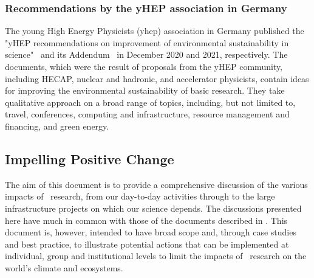 \documentclass[../SustainableHEP.tex]{subfiles}
\begin{document}
\subsubsection{Recommendations by the yHEP association in Germany}

The young High Energy Physicists (\acrshort{yhep}) association in Germany published the "yHEP recommendations on improvement of environmental sustainability in science"~\cite{yHEP1} and its Addendum~\cite{yHEP2} in December 2020 and 2021, respectively. The documents, which were the result of proposals from the yHEP community, including HECAP, nuclear and hadronic, and accelerator physicists, contain ideas for improving the environmental sustainability of basic research. %
They take qualitative approach on a broad range of topics, including, but not limited to, travel, conferences, computing and infrastructure, resource management and financing, and green energy. 


\subsection{Impelling Positive Change}

The aim of this document is to provide a comprehensive discussion of the various impacts of \ACR\ research, from our day-to-day activities through to the large infrastructure projects on which our science depends. The discussions presented here have much in common with those of the documents described in . This document is, however, intended to have broad scope and, through case studies and best practice, to illustrate potential actions that can be implemented at individual, group and institutional levels to limit the impacts of \ACR\ research on the world's climate and ecosystems.
\end{document}
